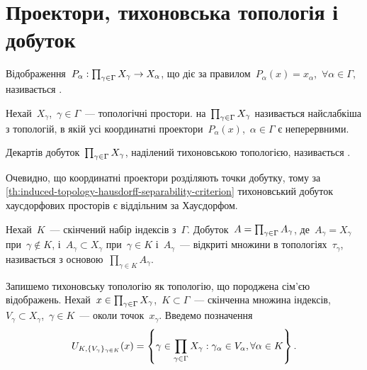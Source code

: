 \section{Проектори, тихоновська топологія і добуток}

\begin{definition}
    Відображення~$P_\alpha: \prod_{\gamma\in\Gamma}{X}_\gamma \to X_\alpha$, що діє за правилом~$P_\alpha(x) = x_\alpha$,~$\forall \alpha \in \Gamma$, називається .
\end{definition}

\begin{definition}
    Нехай~$X_\gamma$,~$\gamma \in \Gamma$~--- топологічні простори.  на~$\prod_{\gamma\in\Gamma}{X}_\gamma$ називається найслабкіша з топологій, в якій усі координатні проектори~$P_\alpha(x)$,~$\alpha \in \Gamma$ є неперервними.
\end{definition}

\begin{definition}
    Декартів добуток~$\prod_{\gamma\in\Gamma}{X}_\gamma$, наділений тихоновською топологією, називається .
\end{definition}

\begin{remark}
    Очевидно, що координатні проектори розділяють точки добутку, тому за \cref{th:induced-topology-hausdorff-separability-criterion} тихоновський добуток хаусдорфових просторів є віддільним за Хаусдорфом.
\end{remark}

\begin{definition}
    Нехай~$K$~--- скінчений набір індексів з~$\Gamma$. Добуток~$A = \prod_{\gamma\in\Gamma}{A}_\gamma$, де~$A_\gamma =  X_\gamma$ при~$\gamma \notin K$, і~$A_\gamma \subset X_\gamma$ при~$\gamma \in K$ і~$A_\gamma$~--- відкриті множини в топологіях~$\tau_\gamma$, називається  з основою~$\prod_{\gamma \in K} A_\gamma$.
\end{definition}

Запишемо тихоновську топологію як топологію, що породжена сім'єю відображень. Нехай~$x \in \prod_{\gamma\in\Gamma}{X}_\gamma$,~$K \subset \Gamma$~--- скінченна множина індексів,~$V_\gamma \subset X_\gamma$,~$\gamma \in K$~--- околи точок~$x_\gamma$. Введемо позначення
\begin{equation*}
    U_{K,\{V_\gamma\}_{\gamma\in K}}(x) =
    \left\{ \gamma \in \prod_{\gamma\in\Gamma}{X}_\gamma: \gamma_\alpha \in V_\alpha, \forall \alpha \in K \right\}.
\end{equation*}

